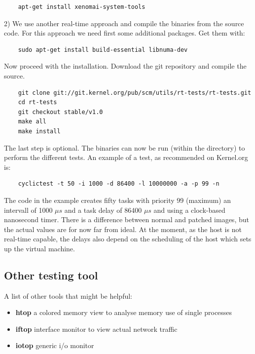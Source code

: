 \documentclass[]{scrartcl}
\begin{document}
\begin{verbatim}
	apt-get install xenomai-system-tools
\end{verbatim}

2) We use another real-time approach and compile the binaries from the source code.
For this approach we need first some additional packages. Get them with:

\begin{verbatim}
	sudo apt-get install build-essential libnuma-dev
\end{verbatim}

Now proceed with the installation. Download the git repository and compile the source.

\begin{verbatim}
	git clone git://git.kernel.org/pub/scm/utils/rt-tests/rt-tests.git
	cd rt-tests
	git checkout stable/v1.0
	make all
	make install
\end{verbatim}

The last step is optional. The binaries can now be run (within the directory) to perform the different tests. An example of a test, as recommended on Kernel.org is: 

\begin{verbatim}
	cyclictest -t 50 -i 1000 -d 86400 -l 10000000 -a -p 99 -n
\end{verbatim}

The code in the example creates fifty tasks with priority 99 (maximum) an intervall of 1000 $\mu s$ and a task delay of 86400 $\mu s$ and using a clock-based nanosecond timer. There is a difference between normal and patched images, but the actual values are for now far from ideal. At the moment, as the host is not real-time capable, the delays also depend on the scheduling of the host which sets up the virtual machine. 

\subsection{Other testing tool}

A list of other tools that might be helpful:

\begin{itemize}
	\item \textbf{htop} a colored memory view to analyse memory use of single processes
	\item \textbf{iftop} interface monitor to view actual network traffic
	\item \textbf{iotop} generic i/o monitor
\end{itemize}
\end{document}
